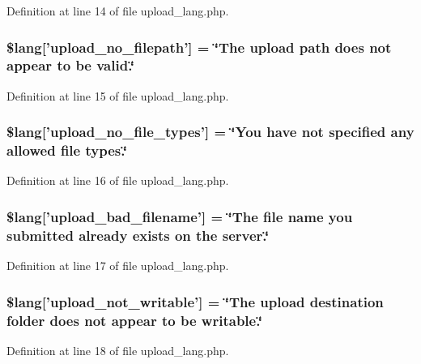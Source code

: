 Definition at line 14 of file upload\-\_\-lang.\-php.

\hypertarget{upload__lang_8php_a3c17908c53072c6a5ef593760aaaa704}{
\subsubsection[{\$lang}]{\setlength{\rightskip}{0pt plus 5cm}\$lang\mbox{[}'upload\-\_\-no\-\_\-filepath'\mbox{]} = \char`\"{}The upload path does {\bf not} appear {\bf to} be valid.\char`\"{}}}\label{upload__lang_8php_a3c17908c53072c6a5ef593760aaaa704}


Definition at line 15 of file upload\-\_\-lang.\-php.

\hypertarget{upload__lang_8php_ab188c98e583c81905dedaad54ad452bb}{
\subsubsection[{\$lang}]{\setlength{\rightskip}{0pt plus 5cm}\$lang\mbox{[}'upload\-\_\-no\-\_\-file\-\_\-types'\mbox{]} = \char`\"{}You have {\bf not} specified any allowed file types.\char`\"{}}}\label{upload__lang_8php_ab188c98e583c81905dedaad54ad452bb}


Definition at line 16 of file upload\-\_\-lang.\-php.

\hypertarget{upload__lang_8php_abb379322384f3f35952a539c63e2c8f7}{
\subsubsection[{\$lang}]{\setlength{\rightskip}{0pt plus 5cm}\$lang\mbox{[}'upload\-\_\-bad\-\_\-filename'\mbox{]} = \char`\"{}The file name you submitted already exists on the server.\char`\"{}}}\label{upload__lang_8php_abb379322384f3f35952a539c63e2c8f7}


Definition at line 17 of file upload\-\_\-lang.\-php.

\hypertarget{upload__lang_8php_aed6bfb5a9094179427f61fcbb582145b}{
\subsubsection[{\$lang}]{\setlength{\rightskip}{0pt plus 5cm}\$lang\mbox{[}'upload\-\_\-not\-\_\-writable'\mbox{]} = \char`\"{}The upload destination folder does {\bf not} appear {\bf to} be writable.\char`\"{}}}\label{upload__lang_8php_aed6bfb5a9094179427f61fcbb582145b}


Definition at line 18 of file upload\-\_\-lang.\-php.

